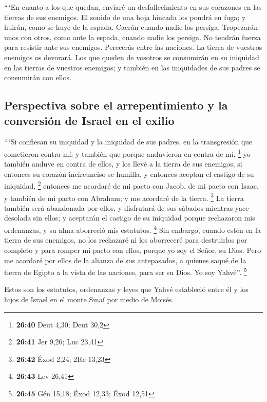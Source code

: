 \begin{paracol}{2}
 ``\,`En cuanto a los que quedan, enviaré un
desfallecimiento en sus corazones en las tierras de sus enemigos. El
sonido de una hoja hincada los pondrá en fuga; y huirán, como se huye de
la espada. Caerán cuando nadie los persiga.  Tropezarán
unos con otros, como ante la espada, cuando nadie los persiga. No
tendrán fuerza para resistir ante sus enemigos. 
Perecerás entre las naciones. La tierra de vuestros enemigos os
devorará.  Los que queden de vosotros se consumirán en su
iniquidad en las tierras de vuestros enemigos; y también en las
iniquidades de sus padres se consumirán con ellos.

\hypertarget{perspectiva-sobre-el-arrepentimiento-y-la-conversiuxf3n-de-israel-en-el-exilio}{%
\subsection{Perspectiva sobre el arrepentimiento y la conversión de
Israel en el
exilio}\label{perspectiva-sobre-el-arrepentimiento-y-la-conversiuxf3n-de-israel-en-el-exilio}}

 ``\,`Si confiesan su iniquidad y la iniquidad de sus
padres, en la transgresión que cometieron contra mí; y también que
porque anduvieron en contra de mí, \footnote{\textbf{26:40} Deut 4,30;
  Deut 30,2}  yo también anduve en contra de ellos, y los
llevé a la tierra de sus enemigos; si entonces su corazón incircunciso
se humilla, y entonces aceptan el castigo de su iniquidad, \footnote{\textbf{26:41}
  Jer 9,26; Luc 23,41}  entonces me acordaré de mi pacto
con Jacob, de mi pacto con Isaac, y también de mi pacto con Abraham; y
me acordaré de la tierra. \footnote{\textbf{26:42} Éxod 2,24; 2Re 13,23}
 La tierra también será abandonada por ellos, y
disfrutará de sus sábados mientras yace desolada sin ellos; y aceptarán
el castigo de su iniquidad porque rechazaron mis ordenanzas, y su alma
aborreció mis estatutos. \footnote{\textbf{26:43} Lev 26,41}
 Sin embargo, cuando estén en la tierra de sus enemigos,
no los rechazaré ni los aborreceré para destruirlos por completo y para
romper mi pacto con ellos, porque yo soy el Señor, su Dios.
 Pero me acordaré por ellos de la alianza de sus
antepasados, a quienes saqué de la tierra de Egipto a la vista de las
naciones, para ser su Dios. Yo soy Yahvé''. \footnote{\textbf{26:45} Gén
  15,18; Éxod 12,33; Éxod 12,51}

 Estos son los estatutos, ordenanzas y leyes que Yahvé
estableció entre él y los hijos de Israel en el monte Sinaí por medio de
Moisés.


\end{paracol}
